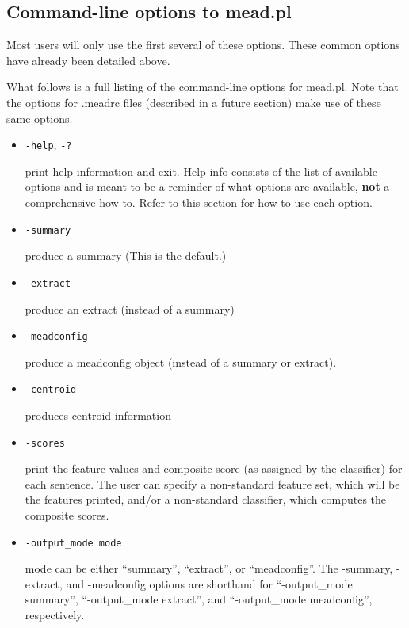 \documentclass[10pt]{article}
\begin{document}
\subsection{Command-line options to mead.pl}

Most users will only use the first several of these options.
These common options have already been detailed above.  

What follows is a full listing of the command-line options for mead.pl.
Note that the options for .meadrc files (described in a future section)
make use of these same options.

\begin{itemize}

\item \verb|-help|, \verb|-?|

  print help information and exit.  Help info consists of
  the list of available options and is meant to be a reminder
  of what options are available, {\bf not} a comprehensive how-to.
  Refer to this section for how to use each option.

\item \verb|-summary|

  produce a summary (This is the default.)

\item \verb|-extract|

  produce an extract (instead of a summary)

\item \verb|-meadconfig|

  produce a meadconfig object (instead of a summary or extract).

\item \verb|-centroid|

  produces centroid information

\item \verb|-scores|

  print the feature values and composite score (as assigned by
  the classifier) for each sentence.  The user can specify a
  non-standard feature set, which will be the features printed,
  and/or a non-standard classifier, which computes the 
  composite scores.

\item \verb|-output_mode mode|

  mode can be either ``summary'', ``extract'', or ``meadconfig''.  
  The -summary, -extract, and -meadconfig options are shorthand for
  ``-output\_mode summary'', ``-output\_mode extract'', and 
  ``-output\_mode meadconfig'', respectively.


\end{itemize}
\end{document}
